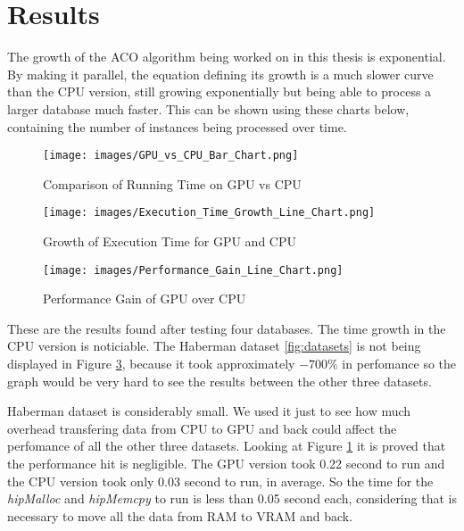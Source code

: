 \section{Results} \label{Results}

The growth of the ACO algorithm being worked on in this thesis is exponential.
By making it parallel, the equation defining its growth is a much slower curve than the CPU version,
still growing exponentially but being able to process a larger database much faster.
This can be shown using these charts below, containing the number of instances being processed over time.

\begin{figure}[ht]
    \centering
    \texttt{[image: images/GPU\_vs\_CPU\_Bar\_Chart.png]}
    \caption{Comparison of Running Time on GPU vs CPU}
    \label{fig:gpu_vs_cpu}
\end{figure}

\begin{figure}[ht]
    \centering
    \texttt{[image: images/Execution\_Time\_Growth\_Line\_Chart.png]}
    \caption{Growth of Execution Time for GPU and CPU}
    \label{fig:execution_time_growth}
\end{figure}

\begin{figure}[ht]
    \centering
    \texttt{[image: images/Performance\_Gain\_Line\_Chart.png]}
    \caption{Performance Gain of GPU over CPU}
    \label{fig:performance_gain}
\end{figure}

These are the results found after testing four databases. The time growth in the CPU version is noticiable.
The Haberman dataset \ref{fig:datasets} is not being displayed in Figure \ref{fig:performance_gain}, because it took approximately $-700\%$
in perfomance so the graph would be very hard to see the results between the other three datasets.

Haberman dataset is considerably small. We used it just to see how much overhead transfering data from CPU to GPU and back
could affect the perfomance of all the other three datasets. Looking at Figure \ref{fig:gpu_vs_cpu} it is proved that
the performance hit is negligible. The GPU version took 0.22 second to run and the CPU version took only
0.03 second to run, in average. So the time for the \emph{hipMalloc} and \emph{hipMemcpy} to run is less than 0.05 second each,
considering that is necessary to move all the data from RAM to VRAM and back.
